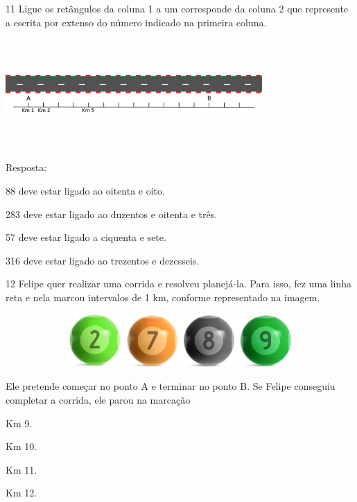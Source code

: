 \num{11} Ligue os retângulos da coluna 1 a um corresponde da coluna 2 que
represente a escrita por extenso do número indicado na primeira coluna.

\includegraphics[width=3.85033in,height=1.64181in]{media/image6.png}


Resposta:

88 deve estar ligado ao oitenta e oito.

283 deve estar ligado ao duzentos e oitenta e três.

57 deve estar ligado a ciquenta e sete.

316 deve estar ligado ao trezentos e dezesseis.

\num{12} Felipe quer realizar uma corrida e resolveu planejá-la. Para isso, fez
uma linha reta e nela marcou intervalos de 1 km, conforme representado na imagem.

\includegraphics[width=5.90556in,height=0.79514in]{media/image7.png}



Ele pretende começar no ponto A e terminar no ponto B. Se Felipe
conseguiu completar a corrida, ele parou na marcação

\begin{escolha}

\item
  Km 9.
\item
  Km 10.
\item
  Km 11.
\item
  Km 12.
\end{escolha}

